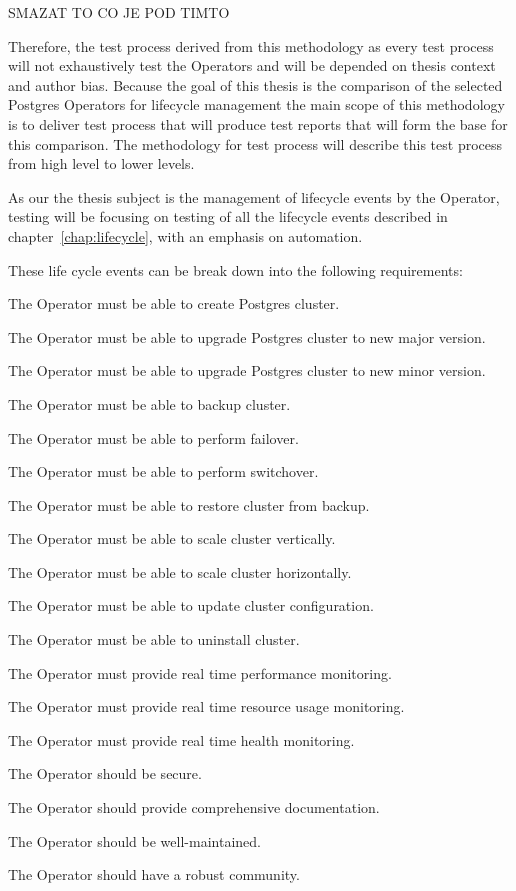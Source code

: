 SMAZAT TO CO JE POD TIMTO



Therefore, the test process derived from this methodology as every test process will not exhaustively test the Operators and will be depended on thesis context and author bias. Because the goal of this thesis is the comparison of the selected Postgres Operators for lifecycle management the main scope of this methodology is to deliver test process that will produce test reports that will form the base for this comparison. The methodology for test process will describe this test process from high level to lower levels.

As our the thesis subject is the management of lifecycle events by the Operator, testing will be focusing on testing of all the lifecycle events described in chapter~\ref{chap:lifecycle}, with an emphasis on automation.

These life cycle events can be break down into the following requirements:

\begin{requirements}
    \item The Operator must be able to create Postgres cluster.
    \item The Operator must be able to upgrade Postgres cluster to new major version.
    \item The Operator must be able to upgrade Postgres cluster to new minor version.
    \item The Operator must be able to backup cluster.
    \item The Operator must be able to perform failover.
    \item The Operator must be able to perform switchover.
    \item The Operator must be able to restore cluster from backup.
    \item The Operator must be able to scale cluster vertically.
    \item The Operator must be able to scale cluster horizontally.
    \item The Operator must be able to update cluster configuration.
    \item The Operator must be able to uninstall cluster.
    \item The Operator must provide real time performance monitoring.
    \item The Operator must provide real time resource usage monitoring.
    \item The Operator must provide real time health monitoring.
    \item The Operator should be secure.
    \item The Operator should provide comprehensive documentation.
    \item The Operator should be well-maintained.
    \item The Operator should have a robust community.
\end{requirements}

